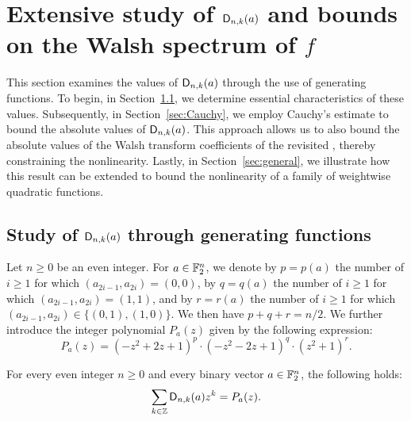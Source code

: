 \documentclass[11pt]{llncs}
\begin{document}









\section{Extensive study of $\mathsf{D}_{n,k}(a)$ and bounds on the Walsh spectrum of $f$}\label{sec:dnk}

This section examines the values of $\mathsf{D}_{n,k}(a)$ through the use of generating functions. To begin, in Section~\ref{sec:genfunc}, we determine essential characteristics of these values. Subsequently, in Section~\ref{sec:Cauchy}, we employ Cauchy's estimate to bound the absolute values of $\mathsf{D}_{n,k}(a)$. This approach allows us to also bound the absolute values of the Walsh transform coefficients of the revisited \hwbf{}, thereby constraining the nonlinearity. Lastly, in Section~\ref{sec:general}, we illustrate how this result can be extended to bound the nonlinearity of a family of weightwise quadratic functions.

\subsection{Study of $\mathsf{D}_{n,k}(a)$ through generating functions}\label{sec:genfunc}

\begin{definition}\label{defi:P_a}
    Let $n\geq 0$ be an even integer. For $a\in\mathbb{F}_2^n$, we denote by $p=p(a)$ the number of $i\geq 1$ for which $(a_{2i-1},a_{2i})=(0,0)$, by $q=q(a)$ the number of $i\geq 1$ for which $(a_{2i-1},a_{2i})=(1,1)$, and by $r=r(a)$ the number of $i\geq 1$ for which $(a_{2i-1},a_{2i})\in\{(0,1),(1,0)\}$. We then have $p+q+r=n/2$. We further introduce the integer polynomial $P_a(z)$ given by the following expression:
    \[
    P_a(z)=(-z^2+2z+1)^{p}\cdot(-z^2-2z+1)^{q}\cdot(z^2+1)^{r}.
    \]
\end{definition}


\begin{proposition}\label{proposition:generating_fct}
	For every even integer $n\geq 0$ and every binary vector $a\in\mathbb{F}_2^n$, the following holds:
    \[
        \sum_{k\in\mathbb{Z}}\mathsf{D}_{n,k}(a) z^k= P_a(z).
    \]
\end{proposition}
\end{document}
